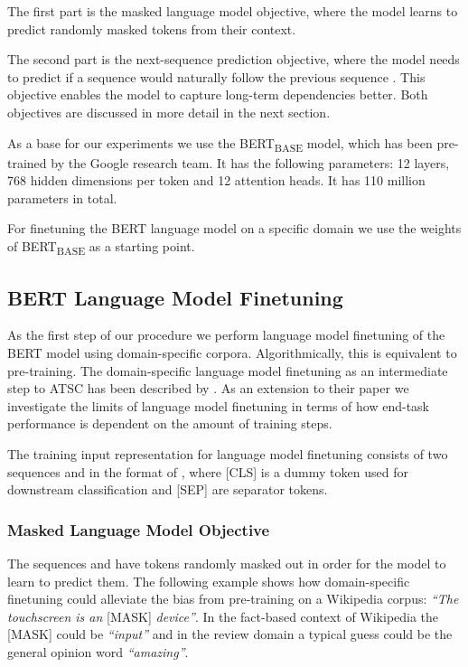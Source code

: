 \documentclass[11pt,a4paper]{article}
\newcommand{\rood}[1]{}
\begin{document}
The first part is the masked language model objective, where the model learns to predict randomly masked tokens from their context.

The second part is the next-sequence prediction objective, where the model needs to predict if a sequence  would naturally follow the previous sequence .
This objective enables the model to capture long-term dependencies better.
Both objectives are discussed in more detail in the next section.

As a base for our experiments we use the BERT\textsubscript{BASE} model, which has been pre-trained by the Google research team. It has the following parameters:
12 layers, 768 hidden dimensions per token and 12 attention heads. It has 110 million parameters in total.

For finetuning the BERT language model on a specific domain we use the weights of BERT\textsubscript{BASE} as a starting point.
\rood{For ATSC, an additional fully-connected layer on top of BERT with a softmax activation function is added.}

\subsection{BERT Language Model Finetuning}
\rood{Outcome: Readers should understand that we use language model (LM) finetuning
  (forget the 2 methods?!) as an intermediate step before classification
  Also they should understand that we try to optimize the number of iteration compared to previous work we would know the limit of significance of improvement.
}
As the first step of our procedure we perform language model finetuning of the BERT
model using domain-specific corpora. 
Algorithmically, this is equivalent to pre-training.
The domain-specific language model finetuning as an intermediate step to ATSC has been described by \citet{Xu2019}. As an extension to their paper we investigate the limits of language model finetuning in terms of how end-task performance is dependent on the amount of training steps. 

The training input representation for language model finetuning consists of two sequences  and  in the format of ,
where 
\textrm{[CLS]} is a dummy token used for downstream classification and \textrm{[SEP]} are separator tokens.
\subsubsection*{Masked Language Model Objective}
The sequences  and  have tokens randomly masked out in order for the model to learn to predict them. 
The following example shows how domain-specific finetuning could alleviate the 
bias from pre-training on a Wikipedia corpus:
\textit{``The touchscreen is an} [MASK] \textit{device''}. In the fact-based context of Wikipedia the [MASK] could be \textit{``input''} and in the review domain a typical guess could be the general opinion word \textit{``amazing''}.
\end{document}
